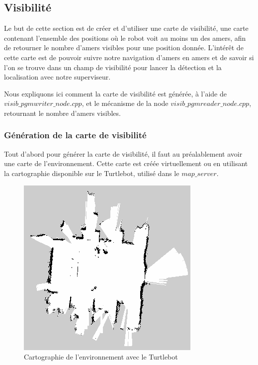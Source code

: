 \documentclass[10pt,a4paper]{article}
\begin{document}
\subsection{Visibilité}
\label{sec:Visibilite}

Le but de cette section est de créer et d'utiliser une carte de visibilité, une carte contenant l'ensemble des positions où le robot voit au moins un des amers, afin de retourner le nombre d'amers visibles pour une position donnée. L’intérêt de cette carte est de pouvoir suivre notre navigation d'amers en amers et de savoir si l'on se trouve dans un champ de visibilité pour lancer la détection et la localisation avec notre superviseur.

Nous expliquons ici comment la carte de visibilité est générée, à l'aide de $visib\_pgmwriter\_node.cpp$, et le mécanisme de la node $visib\_pgmreader\_node.cpp$, retournant le nombre d'amers visibles.

\subsubsection{Génération de la carte de visibilité}
Tout d'abord pour générer la carte de visibilité, il faut au préalablement avoir une carte de l'environnement. Cette carte est créée virtuellement ou en utilisant la cartographie disponible sur le Turtlebot, utilisé dans le $map\_server$.

\begin{figure}[!h]
\center
\includegraphics[scale=0.6]{figures/aip_map.png} 
\caption{Cartographie de l'environnement avec le Turtlebot}	
\end{figure}
\end{document}
